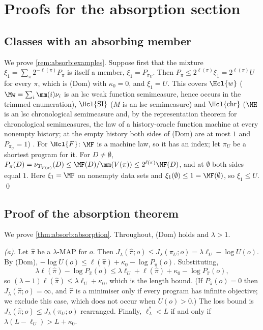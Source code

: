 \section{Proofs for the absorption section}\label{app:absorb}

\subsection{Classes with an absorbing member}\label{app:absorb:examples}

We prove \cref{rem:absorb:examples}. Suppose first that the mixture $\xi_1=\sum_\pi2^{-\ell(\pi)}P_\pi$ is itself a member, $\xi_1=P_{\pi_U}$. Then $P_\pi\le2^{\ell(\pi)}\xi_1=2^{\ell(\pi)}U$ for every $\pi$, which is (Dom) with $\kappa_0=0$, and $\xi_1=U$. This covers $\Hcl{w}$ ($\Mw=\sum_i\mm(i)\nu_i$ is an lsc weak function semimeasure, hence occurs in the trimmed enumeration), $\Hcl{\mathrm{SI}}$ ($M$ is an lsc semimeasure) and $\Hcl{\mathrm{chr}}$ ($\MH$ is an lsc chronological semimeasure and, by the representation theorem for chronological semimeasures, the law of a history-oracle function machine at every nonempty history; at the empty history both sides of (Dom) are at most $1$ and $P_{\pi_U}=1$) \citep{claudeSFI2026fundamentals}. For $\Hcl{F}$: $\MF$ is a machine law, so it has an index; let $\pi_U$ be a shortest program for it. For $D\ne\emptyset$, $P_\pi(D)=\nu_{T_{V(\pi)}}(D)\le\MF(D)/\mm(V(\pi))\le2^{\ell(\pi)}\MF(D)$, and at $\emptyset$ both sides equal $1$. Here $\xi_1=\MF$ on nonempty data sets and $\xi_1(\emptyset)\le1=\MF(\emptyset)$, so $\xi_1\le U$. \qed

\subsection{Proof of the absorption theorem}\label{app:absorb:absorption}

We prove \cref{thm:absorb:absorption}. Throughout, (Dom) holds and $\lambda>1$.

\emph{(a).} Let $\hat\pi$ be a $\lambda$-MAP for $o$. Then $J_\lambda(\hat\pi;o)\le J_\lambda(\pi_U;o)=\lambda\ell_U-\log U(o)$. By (Dom), $-\log U(o)\le\ell(\hat\pi)+\kappa_0-\log P_{\hat\pi}(o)$. Substituting,
\[
\lambda\ell(\hat\pi)-\log P_{\hat\pi}(o)\le\lambda\ell_U+\ell(\hat\pi)+\kappa_0-\log P_{\hat\pi}(o),
\]
so $(\lambda-1)\ell(\hat\pi)\le\lambda\ell_U+\kappa_0$, which is the length bound. (If $P_{\hat\pi}(o)=0$ then $J_\lambda(\hat\pi;o)=\infty$, and $\hat\pi$ is a minimiser only if every program has infinite objective; we exclude this case, which does not occur when $U(o)>0$.) The loss bound is $J_\lambda(\hat\pi;o)\le J_\lambda(\pi_U;o)$ rearranged. Finally, $\ell^*_\lambda<L$ if and only if $\lambda(L-\ell_U)>L+\kappa_0$.

